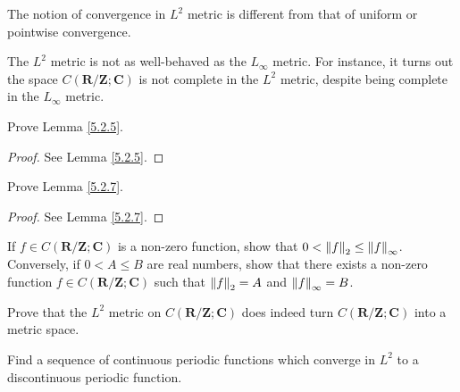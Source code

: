 \begin{remark}\label{5.2.9}
    The notion of convergence in \(L^2\) metric is different from that of uniform or pointwise convergence.
\end{remark}

\begin{remark}\label{5.2.10}
    The \(L^2\) metric is not as well-behaved as the \(L_\infty\) metric.
    For instance, it turns out the space \(C(\mathbf{R} / \mathbf{Z} ; \mathbf{C})\) is not complete in the \(L^2\) metric, despite being complete in the \(L_\infty\) metric.
\end{remark}

\exercisesection

\begin{exercise}\label{ex 5.2.1}
    Prove Lemma \ref{5.2.5}.
\end{exercise}

\begin{proof}
    See Lemma \ref{5.2.5}.
\end{proof}

\begin{exercise}\label{ex 5.2.2}
    Prove Lemma \ref{5.2.7}.
\end{exercise}

\begin{proof}
    See Lemma \ref{5.2.7}.
\end{proof}

\begin{exercise}\label{ex 5.2.3}
    If \(f \in C(\mathbf{R} / \mathbf{Z} ; \mathbf{C})\) is a non-zero function, show that \(0 < \norm*{f}_2 \leq \norm*{f}_\infty\).
    Conversely, if \(0 < A \leq B\) are real numbers, show that there exists a non-zero function \(f \in C(\mathbf{R} / \mathbf{Z} ; \mathbf{C})\) such that \(\norm*{f}_2 = A\) and \(\norm*{f}_\infty = B\).
\end{exercise}

\begin{exercise}\label{ex 5.2.4}
    Prove that the \(L^2\) metric on \(C(\mathbf{R} / \mathbf{Z} ; \mathbf{C})\) does indeed turn \(C(\mathbf{R} / \mathbf{Z} ; \mathbf{C})\) into a metric space.
\end{exercise}

\begin{exercise}\label{ex 5.2.5}
    Find a sequence of continuous periodic functions which converge in \(L^2\) to a discontinuous periodic function.
\end{exercise}

